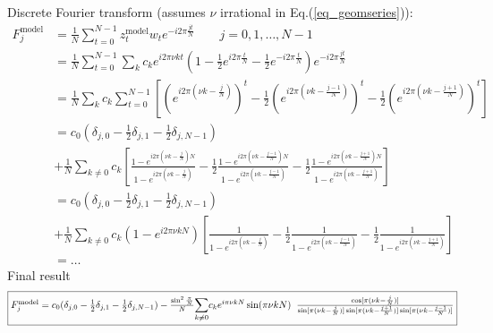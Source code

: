 \documentclass[english, parskip=full]{scrartcl}
\begin{document}
Discrete Fourier transform (assumes $\nu$ irrational in Eq.(\ref{eq_geomseries})):
\begin{align}
  F^{\text{model}}_j &= \frac{1}{N} \sum_{t=0}^{N-1} z^{\text{model}}_t w_t e^{- i 2 \pi \frac{j t}{N}}
  \qquad
  j=0,1,\dots, N-1
  \\
  &=
  \frac{1}{N} \sum_{t=0}^{N-1} \sum_k c_k e^{i 2 \pi \nu k t}
  \left( 1 - \frac{1}{2} e^{i 2 \pi \frac{t}{N}} - \frac{1}{2} e^{- i 2 \pi \frac{t}{N}} \right)
  e^{- i 2 \pi \frac{j t}{N}}
  \\
  &=
  \frac{1}{N} \sum_k c_k \sum_{t=0}^{N-1} \left[
                  \left( e^{i 2 \pi (\nu k - \frac{j}{N}) } \right)^t
    - \frac{1}{2} \left( e^{i 2 \pi (\nu k - \frac{j-1}{N}) } \right)^t
    - \frac{1}{2} \left( e^{i 2 \pi (\nu k - \frac{j+1}{N}) } \right)^t
  \right]
  \\
  &=
  c_0 (\delta_{j,0} - \frac{1}{2} \delta_{j,1} - \frac{1}{2} \delta_{j,N-1} )
  \\
  &
  + \frac{1}{N} \sum_{k \ne 0} c_k \left[
                  \frac{1-e^{i 2 \pi (\nu k - \frac{j}{N})N }}{1-e^{i 2 \pi (\nu k - \frac{j}{N}) } }
    - \frac{1}{2} \frac{1-e^{i 2 \pi (\nu k - \frac{j-1}{N})N }}{1-e^{i 2 \pi (\nu k - \frac{j-1}{N}) } }
    - \frac{1}{2} \frac{1-e^{i 2 \pi (\nu k - \frac{j+1}{N})N }}{1-e^{i 2 \pi (\nu k - \frac{j+1}{N}) } }
  \right]
  \label{eq_geomseries}
  \\
  &=
  c_0 (\delta_{j,0} - \frac{1}{2} \delta_{j,1} - \frac{1}{2} \delta_{j,N-1} )
  \\
  &
  + \frac{1}{N} \sum_{k \ne 0} c_k (1-e^{i 2 \pi \nu k N })\left[
                  \frac{1}{1-e^{i 2 \pi (\nu k - \frac{j}{N}) } }
    - \frac{1}{2} \frac{1}{1-e^{i 2 \pi (\nu k - \frac{j-1}{N}) } }
    - \frac{1}{2} \frac{1}{1-e^{i 2 \pi (\nu k - \frac{j+1}{N}) } }
  \right]
  \\
  &= \dots
\end{align}
Final result
\begin{equation}
  \fbox{$
  F^{\text{model}}_j =
  c_0 (\delta_{j,0} - \frac{1}{2} \delta_{j,1} - \frac{1}{2} \delta_{j,N-1} )
  - \frac{\sin^2 \frac{\pi}{N}}{N} {\displaystyle \sum_{k \ne 0}^{}} c_k
  e^{i \pi \nu k N} \sin(\pi \nu k N) \;\;
  \frac{\cos[\pi(\nu k - \frac{j}{N})]}
       {\sin[\pi(\nu k - \frac{j}{N})] \sin[\pi(\nu k - \frac{j+1}{N})] \sin[\pi(\nu k - \frac{j-1}{N})]}
  $}
  \label{eq_dfft}
\end{equation}
\end{document}
